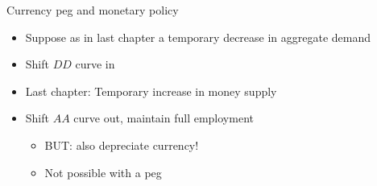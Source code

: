 \documentclass{beamer}
\begin{document}
\begin{frame}{Currency peg and monetary policy}

    \begin{itemize}
        \item Suppose as in last chapter a temporary decrease in aggregate demand
        \item Shift $DD$ curve in
        \item Last chapter: Temporary increase in money supply 
        \item Shift $AA$ curve out, maintain full employment 
        \begin{itemize}
            \item BUT: also depreciate currency!
            \item Not possible with a peg
        \end{itemize}
    \end{itemize}

\end{frame}
        
\end{document}
